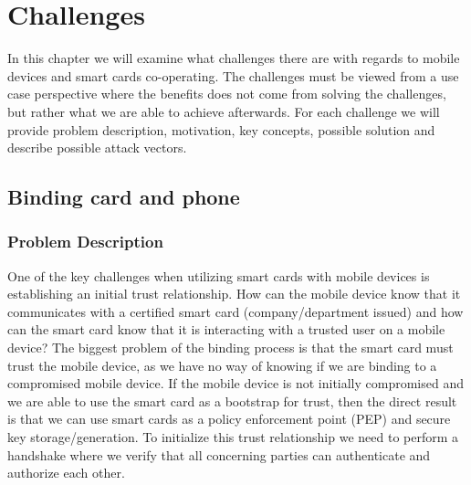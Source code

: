 \chapter{Challenges}
In this chapter we will examine what challenges there are with regards to mobile devices and smart cards co-operating. The challenges must be viewed from a use case perspective where the benefits does not come from solving the challenges, but rather what we are able to achieve afterwards. For each challenge we will provide problem description, motivation, key concepts, possible solution and describe possible attack vectors.
\section{Binding card and phone}
\label{sec:bindingcardandphone}
\subsection{Problem Description}
One of the key challenges when utilizing smart cards with mobile devices is establishing an initial trust relationship. How can the mobile device know that it communicates with a certified smart card (company/department issued) and how can the smart card know that it is interacting with a trusted user on a mobile device? The biggest problem of the binding process is that the smart card must trust the mobile device, as we have no way of knowing if we are binding to a compromised mobile device.  If the mobile device is not initially compromised and we are able to use the smart card as a bootstrap for trust, then the direct result is that we can use smart cards as a policy enforcement point (PEP) and secure key storage/generation. To initialize this trust relationship we need to perform a handshake where we verify that all concerning parties can authenticate and authorize each other.

